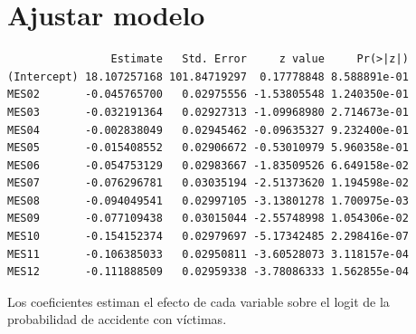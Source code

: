\documentclass[
  spanish,
  11pt,
  letterpaper,
]{book}
\newenvironment{Shaded}{}{}
\newcommand{\AttributeTok}[1]{\textcolor[rgb]{0.84,0.23,0.29}{#1}}
\newcommand{\ControlFlowTok}[1]{\textcolor[rgb]{0.84,0.23,0.29}{#1}}
\newcommand{\DecValTok}[1]{\textcolor[rgb]{0.00,0.36,0.77}{#1}}
\newcommand{\FunctionTok}[1]{\textcolor[rgb]{0.44,0.26,0.76}{#1}}
\newcommand{\NormalTok}[1]{\textcolor[rgb]{0.14,0.16,0.18}{#1}}
\newcommand{\OtherTok}[1]{\textcolor[rgb]{0.44,0.26,0.76}{#1}}
\newcommand{\SpecialCharTok}[1]{\textcolor[rgb]{0.00,0.36,0.77}{#1}}
\newcommand{\StringTok}[1]{\textcolor[rgb]{0.01,0.18,0.38}{#1}}
\begin{document}
\section{Ajustar modelo}\label{ajustar-modelo}

\begin{Shaded}
\end{Shaded}

\begin{verbatim}
                Estimate   Std. Error     z value     Pr(>|z|)
(Intercept) 18.107257168 101.84719297  0.17778848 8.588891e-01
MES02       -0.045765700   0.02975556 -1.53805548 1.240350e-01
MES03       -0.032191364   0.02927313 -1.09968980 2.714673e-01
MES04       -0.002838049   0.02945462 -0.09635327 9.232400e-01
MES05       -0.015408552   0.02906672 -0.53010979 5.960358e-01
MES06       -0.054753129   0.02983667 -1.83509526 6.649158e-02
MES07       -0.076296781   0.03035194 -2.51373620 1.194598e-02
MES08       -0.094049541   0.02997105 -3.13801278 1.700975e-03
MES09       -0.077109438   0.03015044 -2.55748998 1.054306e-02
MES10       -0.154152374   0.02979697 -5.17342485 2.298416e-07
MES11       -0.106385033   0.02950811 -3.60528073 3.118157e-04
MES12       -0.111888509   0.02959338 -3.78086333 1.562855e-04
\end{verbatim}

\begin{tcolorbox}[enhanced jigsaw, arc=.35mm, bottomrule=.15mm, bottomtitle=1mm, breakable, colback=white, colbacktitle=quarto-callout-tip-color!10!white, colframe=quarto-callout-tip-color-frame, coltitle=black, left=2mm, leftrule=.75mm, opacityback=0, opacitybacktitle=0.6, rightrule=.15mm, title=\textcolor{quarto-callout-tip-color}{\faLightbulb}\hspace{0.5em}{Interpretación del resultado}, titlerule=0mm, toprule=.15mm, toptitle=1mm]

Los coeficientes estiman el efecto de cada variable sobre el logit de la
probabilidad de accidente con víctimas.

\end{tcolorbox}
\end{document}
